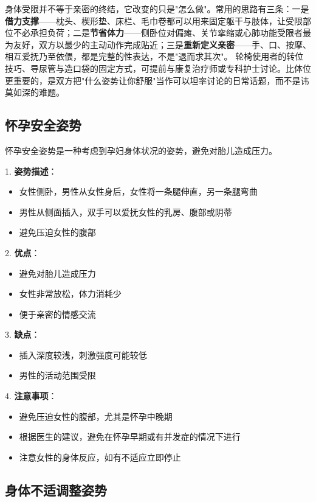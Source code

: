 \documentclass[12pt,UTF8]{ctexbook}
\begin{document}
身体受限并不等于亲密的终结，它改变的只是"怎么做"。常用的思路有三条：一是\textbf{借力支撑}——枕头、楔形垫、床栏、毛巾卷都可以用来固定躯干与肢体，让受限部位不必承担负荷；二是\textbf{节省体力}——侧卧位对偏瘫、关节挛缩或心肺功能受限者最为友好，双方以最少的主动动作完成贴近；三是\textbf{重新定义亲密}——手、口、按摩、相互爱抚乃至依偎，都是完整的性表达，不是"退而求其次"。
轮椅使用者的转位技巧、导尿管与造口袋的固定方式，可提前与康复治疗师或专科护士讨论。比体位更重要的，是双方把"什么姿势让你舒服"当作可以坦率讨论的日常话题，而不是讳莫如深的难题。



\subsection{怀孕安全姿势}

怀孕安全姿势是一种考虑到孕妇身体状况的姿势，避免对胎儿造成压力。

1. \textbf{姿势描述}：
  \begin{itemize}
  \item 女性侧卧，男性从女性身后，女性将一条腿伸直，另一条腿弯曲
  \item 男性从侧面插入，双手可以爱抚女性的乳房、腹部或阴蒂
  \item 避免压迫女性的腹部
  \end{itemize}

2. \textbf{优点}：
  \begin{itemize}
  \item 避免对胎儿造成压力
  \item 女性非常放松，体力消耗少
  \item 便于亲密的情感交流
  \end{itemize}

3. \textbf{缺点}：
  \begin{itemize}
  \item 插入深度较浅，刺激强度可能较低
  \item 男性的活动范围受限
  \end{itemize}

4. \textbf{注意事项}：
  \begin{itemize}
  \item 避免压迫女性的腹部，尤其是怀孕中晚期
  \item 根据医生的建议，避免在怀孕早期或有并发症的情况下进行
  \item 注意女性的身体反应，如有不适应立即停止
  \end{itemize}

\subsection{身体不适调整姿势}
\end{document}

